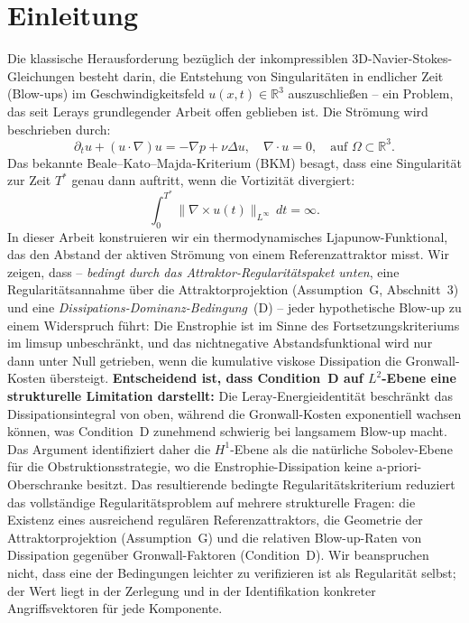 \documentclass[12pt,a4paper]{article}
\theoremstyle{definition}
\theoremstyle{plain}
\theoremstyle{remark}
\begin{document}
\section{Einleitung}
Die klassische Herausforderung bezüglich der inkompressiblen 3D-Navier-Stokes-Gleichungen besteht darin, die Entstehung von Singularitäten in endlicher Zeit (Blow-ups) im Geschwindigkeitsfeld $u(x,t) \in \mathbb{R}^3$ auszuschließen -- ein Problem, das seit Lerays grundlegender Arbeit \cite{Leray1934} offen geblieben ist. Die Strömung wird beschrieben durch:
\begin{equation}
    \partial_t u + (u \cdot \nabla) u = -\nabla p + \nu \Delta u, \quad \nabla \cdot u = 0, \quad \text{auf } \Omega \subset \mathbb{R}^3.
\end{equation}
Das bekannte Beale--Kato--Majda-Kriterium (BKM) \cite{BealeKatoMajda1984} besagt, dass eine Singularität zur Zeit $T^*$ genau dann auftritt, wenn die Vortizität divergiert:
\begin{equation}
    \int_0^{T^*} \|\nabla \times u(t)\|_{L^\infty} \, dt = \infty.
\end{equation}
In dieser Arbeit konstruieren wir ein thermodynamisches Ljapunow-Funktional, das den Abstand der aktiven Strömung von einem Referenzattraktor misst. Wir zeigen, dass -- \emph{bedingt durch das Attraktor-Regularitätspaket unten}, eine Regularitätsannahme über die Attraktorprojektion (Assumption~G, Abschnitt~3) und eine \emph{Dissipations-Dominanz-Bedingung}~(D) -- jeder hypothetische Blow-up zu einem Widerspruch führt: Die Enstrophie ist im Sinne des Fortsetzungskriteriums im limsup unbeschränkt, und das nichtnegative Abstandsfunktional wird nur dann unter Null getrieben, wenn die kumulative viskose Dissipation die Gronwall-Kosten übersteigt. \textbf{Entscheidend ist, dass Condition~D auf $L^2$-Ebene eine strukturelle Limitation darstellt:} Die Leray-Energieidentität beschränkt das Dissipationsintegral von oben, während die Gronwall-Kosten exponentiell wachsen können, was Condition~D zunehmend schwierig bei langsamem Blow-up macht. Das Argument identifiziert daher die $H^1$-Ebene als die natürliche Sobolev-Ebene für die Obstruktionsstrategie, wo die Enstrophie-Dissipation keine a-priori-Oberschranke besitzt. Das resultierende bedingte Regularitätskriterium reduziert das vollständige Regularitätsproblem auf mehrere strukturelle Fragen: die Existenz eines ausreichend regulären Referenzattraktors, die Geometrie der Attraktorprojektion (Assumption~G) und die relativen Blow-up-Raten von Dissipation gegenüber Gronwall-Faktoren (Condition~D). Wir beanspruchen nicht, dass eine der Bedingungen leichter zu verifizieren ist als Regularität selbst; der Wert liegt in der Zerlegung und in der Identifikation konkreter Angriffsvektoren für jede Komponente.
\end{document}

